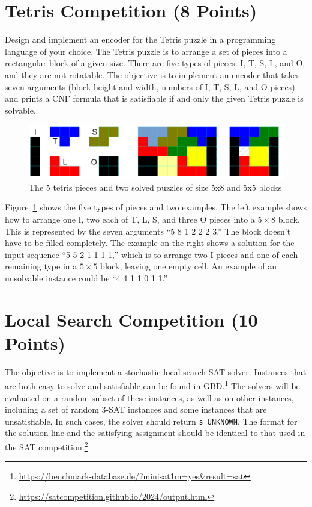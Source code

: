 \documentclass{article}
\begin{document}
\section{Tetris Competition (8 Points)}

Design and implement an encoder for the Tetris puzzle in a programming language of your choice.
The Tetris puzzle is to arrange a set of pieces into a rectangular block of a given size.
There are five types of pieces: I, T, S, L, and O, and they are not rotatable.
The objective is to implement an encoder that takes seven arguments (block height and width, numbers of I, T, S, L, and O pieces) and prints a CNF formula that is satisfiable if and only the given Tetris puzzle is solvable.

\begin{figure}[h]
    \centering
    \includegraphics[width=\linewidth]{tetris.pdf}
    \caption{The 5 tetris pieces and two solved puzzles of size 5x8 and 5x5 blocks}
    \label{fig:tetris}
\end{figure}

Figure~\ref{fig:tetris} shows the five types of pieces and two examples.
The left example shows how to arrange one I, two each of T, L, S, and three O pieces into a $5 \times 8$ block.
This is represented by the seven arguments ``5 8 1 2 2 2 3.''
The block doesn't have to be filled completely.
The example on the right shows a solution for the input sequence ``5 5 2 1 1 1 1,'' which is to arrange two I pieces and one of each remaining type in a $5 \times 5$ block, leaving one empty cell.
An example of an unsolvable instance could be ``4 4 1 1 0 1 1.''

\section{Local Search Competition (10 Points)}

The objective is to implement a stochastic local search SAT solver.
Instances that are both easy to solve and satisfiable can be found in GBD.\footnote{\url{https://benchmark-database.de/?minisat1m=yes&result=sat}}
The solvers will be evaluated on a random subset of these instances, as well as on other instances, including a set of random 3-SAT instances and some instances that are unsatisfiable.
In such cases, the solver should return \texttt{s UNKNOWN}.
The format for the solution line and the satisfying assignment should be identical to that used in the SAT competition.\footnote{\url{https://satcompetition.github.io/2024/output.html}}
\end{document}

